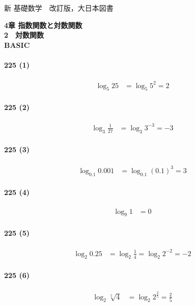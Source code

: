 \documentclass[fleqn,a4j,dvipdfmx,uplatex,twocolumn]{jsarticle}
\begin{document}
\begin{flushleft}
  新 基礎数学　改訂版，大日本図書
\end{flushleft}
\begin{center}
  \textbf{4章 指数関数と対数関数}\\
  \textbf{2　対数関数}\\
  \textbf{BASIC}\\
\end{center}

\paragraph{225 (1)}
\begin{align*}
  \log_{5}25 &= \log_{5}5^2 = 2
\end{align*}

\paragraph{225 (2)}
\begin{align*}
  \log_{3}\frac{1}{27} &= \log_{3}3^{-3} = -3
\end{align*}

\paragraph{225 (3)}
\begin{align*}
  \log_{0.1}0.001 &= \log_{0.1}(0.1)^3 = 3
\end{align*}

\paragraph{225 (4)}
\begin{align*}
  \log_{9}1 &= 0
\end{align*}

\paragraph{225 (5)}
\begin{align*}
  \log_{2}0.25 &= \log_{2}\frac{1}{4} = \log_{2}2^{-2} = -2
\end{align*}

\paragraph{225 (6)}
\begin{align*}
  \log_{2}\sqrt[5]{4} &= \log_{2}2^{\frac{2}{5}} = \frac{2}{5}
\end{align*}
\end{document}
